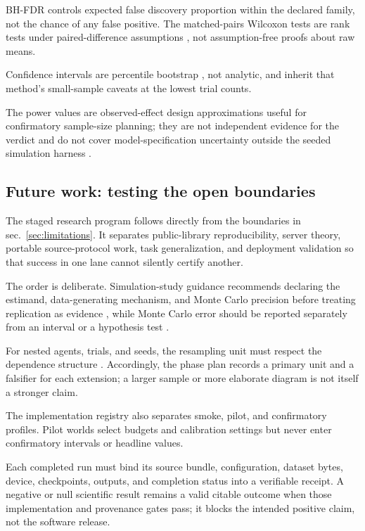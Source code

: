 \documentclass[
  english,
]{article}
\theoremstyle{plain}
\theoremstyle{definition}
\theoremstyle{remark}
\theoremstyle{definition}
\begin{document}
BH-FDR controls expected false discovery proportion within the declared
family, not the chance of any false positive. The matched-pairs Wilcoxon
tests are rank tests under paired-difference assumptions
\citep{wilcoxon1945individual, fay2010wilcoxon}, not assumption-free
proofs about raw means.

Confidence intervals are percentile bootstrap
\citep{efron1993bootstrap}, not analytic, and inherit that method's
small-sample caveats at the lowest trial counts.

The power values are observed-effect design approximations useful for
confirmatory sample-size planning; they are not independent evidence for
the verdict and do not cover model-specification uncertainty outside the
seeded simulation harness \citep{wasserstein2016asa}.

\subsection{Future work: testing the open boundaries}\label{sec:future}

The staged research program follows directly from the boundaries in
sec.~\ref{sec:limitations}. It separates public-library reproducibility,
server theory, portable source-protocol work, task generalization, and
deployment validation so that success in one lane cannot silently
certify another.

The order is deliberate. Simulation-study guidance recommends declaring
the estimand, data-generating mechanism, and Monte Carlo precision
before treating replication as evidence \citep{morris2019simulation},
while Monte Carlo error should be reported separately from an interval
or a hypothesis test \citep{koehler2009mcse}.

For nested agents, trials, and seeds, the resampling unit must respect
the dependence structure \citep{loy2021lmeresampler}. Accordingly, the
phase plan records a primary unit and a falsifier for each extension; a
larger sample or more elaborate diagram is not itself a stronger claim.

The implementation registry also separates smoke, pilot, and
confirmatory profiles. Pilot worlds select budgets and calibration
settings but never enter confirmatory intervals or headline values.

Each completed run must bind its source bundle, configuration, dataset
bytes, device, checkpoints, outputs, and completion status into a
verifiable receipt. A negative or null scientific result remains a valid
citable outcome when those implementation and provenance gates pass; it
blocks the intended positive claim, not the software release.
\end{document}
